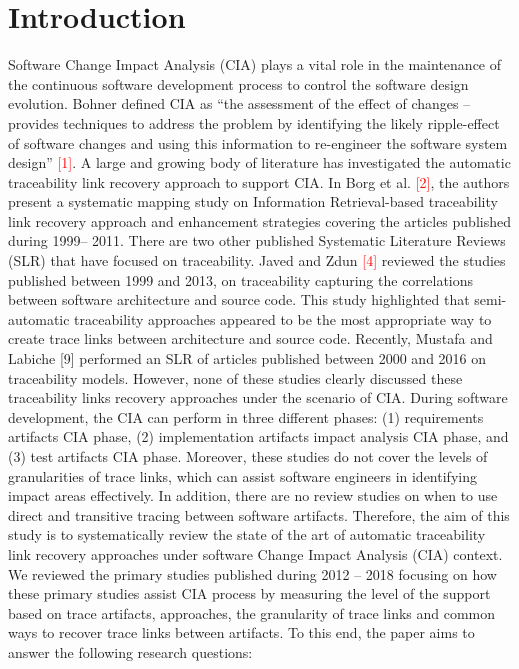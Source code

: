 \documentclass[conference]{IEEEtran}
\begin{document}
\section{Introduction}
Software Change Impact Analysis (CIA) plays a vital role in the maintenance of the continuous software development process to control the software design evolution. Bohner defined CIA as “the assessment of the effect of changes – provides techniques to address the problem by identifying the likely ripple-effect of software changes and using this information to re-engineer the software system design” \textcolor{red}{[1]}.  A large and growing body of literature has investigated the automatic traceability link recovery approach to support CIA. 
In Borg et al. \textcolor{red}{[2]}, the authors present a systematic mapping study on Information Retrieval-based traceability link recovery approach and enhancement strategies covering the articles published during 1999– 2011. There are two other published Systematic Literature Reviews (SLR) that have focused on traceability. Javed and Zdun \textcolor{red}{[4]} reviewed the studies published between 1999 and 2013, on traceability capturing the correlations  between software architecture and source code. This study highlighted that semi-automatic traceability approaches appeared to be the most appropriate way to create trace links between architecture and source code. Recently, Mustafa and Labiche [9] performed an SLR of articles published between 2000 and 2016 on traceability models. However, none of these studies clearly discussed these traceability links recovery approaches under the scenario of CIA. During software development, the CIA can perform in three different phases: (1) requirements artifacts CIA phase, (2) implementation artifacts impact analysis CIA phase, and (3) test artifacts CIA phase. Moreover, these studies do not cover the levels of granularities of trace links, which can assist software engineers in identifying impact areas effectively. In addition, there are no review studies on when to use direct and transitive tracing between software artifacts. 
Therefore, the aim of this study is to systematically review the state of the art of automatic traceability link recovery approaches under software Change Impact Analysis (CIA) context. We reviewed the primary studies published during 2012 – 2018 focusing on how these primary studies assist CIA process by measuring the level of the support based on trace artifacts, approaches, the granularity of trace links and common ways to recover trace links between artifacts. To this end, the paper aims to answer the following research questions: 
\end{document}
